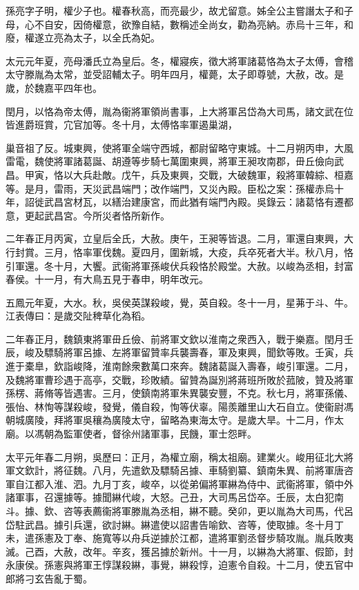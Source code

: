 
\begin{pinyinscope}
孫亮字子明，權少子也。權春秋高，而亮最少，故尤留意。姊全公主嘗譖太子和子母，心不自安，因倚權意，欲豫自結，數稱述全尚女，勸為亮納。赤烏十三年，和廢，權遂立亮為太子，以全氏為妃。

太元元年夏，亮母潘氏立為皇后。冬，權寢疾，徵大將軍諸葛恪為太子太傅，會稽太守滕胤為太常，並受詔輔太子。明年四月，權薨，太子即尊號，大赦，改。是歲，於魏嘉平四年也。

閏月，以恪為帝太傅，胤為衞將軍領尚書事，上大將軍呂岱為大司馬，諸文武在位皆進爵班賞，宂官加等。冬十月，太傅恪率軍遏巢湖，

巢音祖了反。城東興，使將軍全端守西城，都尉留略守東城。十二月朔丙申，大風雷電，魏使將軍諸葛誕、胡遵等步騎七萬圍東興，將軍王昶攻南郡，毌丘儉向武昌。甲寅，恪以大兵赴敵。戊午，兵及東興，交戰，大破魏軍，殺將軍韓綜、桓嘉等。是月，雷雨，天災武昌端門；改作端門，又災內殿。臣松之案：孫權赤烏十年，詔徙武昌宮材瓦，以繕治建康宮，而此猶有端門內殿。吳錄云：諸葛恪有遷都意，更起武昌宮。今所災者恪所新作。

二年春正月丙寅，立皇后全氏，大赦。庚午，王昶等皆退。二月，軍還自東興，大行封賞。三月，恪率軍伐魏。夏四月，圍新城，大疫，兵卒死者大半。秋八月，恪引軍還。冬十月，大饗。武衞將軍孫峻伏兵殺恪於殿堂。大赦。以峻為丞相，封富春侯。十一月，有大鳥五見于春申，明年改元。

五鳳元年夏，大水。秋，吳侯英謀殺峻，覺，英自殺。冬十一月，星茀于斗、牛。江表傳曰：是歲交阯稗草化為稻。

二年春正月，魏鎮東將軍毌丘儉、前將軍文欽以淮南之衆西入，戰于樂嘉。閏月壬辰，峻及驃騎將軍呂據、左將軍留贊率兵襲壽春，軍及東興，聞欽等敗。壬寅，兵進于橐臯，欽詣峻降，淮南餘衆數萬口來奔。魏諸葛誕入壽春，峻引軍還。二月，及魏將軍曹珍遇于高亭，交戰，珍敗績。留贊為誕別將蔣班所敗於菰陂，贊及將軍孫楞、蔣脩等皆遇害。三月，使鎮南將軍朱異襲安豐，不克。秋七月，將軍孫儀、張怡、林恂等謀殺峻，發覺，儀自殺，恂等伏辜。陽羨離里山大石自立。使衞尉馮朝城廣陵，拜將軍吳穰為廣陵太守，留略為東海太守。是歲大旱。十二月，作太廟。以馮朝為監軍使者，督徐州諸軍事，民饑，軍士怨畔。

太平元年春二月朔，吳歷曰：正月，為權立廟，稱太祖廟。建業火。峻用征北大將軍文欽計，將征魏。八月，先遣欽及驃騎呂據、車騎劉纂、鎮南朱異、前將軍唐咨軍自江都入淮、泗。九月丁亥，峻卒，以從弟偏將軍綝為侍中、武衞將軍，領中外諸軍事，召還據等。據聞綝代峻，大怒。己丑，大司馬呂岱卒。壬辰，太白犯南斗。據、欽、咨等表薦衞將軍滕胤為丞相，綝不聽。癸卯，更以胤為大司馬，代呂岱駐武昌。據引兵還，欲討綝。綝遣使以詔書告喻欽、咨等，使取據。冬十月丁未，遣孫憲及丁奉、施寬等以舟兵逆據於江都，遣將軍劉丞督步騎攻胤。胤兵敗夷滅。己酉，大赦，改年。辛亥，獲呂據於新州。十一月，以綝為大將軍、假節，封永康侯。孫憲與將軍王惇謀殺綝，事覺，綝殺惇，迫憲令自殺。十二月，使五官中郎將刁玄告亂于蜀。


\end{pinyinscope}
